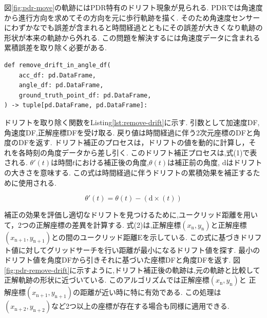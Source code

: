 


図\ref{fig:pdr-move}の軌跡にはPDR特有のドリフト現象が見られる.
PDRでは角速度から進行方向を求めてその方向を元に歩行軌跡を描く.
そのため角速度センサーにわずかなでも誤差が含まれると時間経過とともにその誤差が大きくなり軌跡の形状が本来の軌跡から外れる.
この問題を解決するには角速度データに含まれる累積誤差を取り除く必要がある.


\begin{lstlisting}[caption={ドリフト除去}, label=lst:remove-drift]
def remove_drift_in_angle_df(
    acc_df: pd.DataFrame,
    angle_df: pd.DataFrame,
    ground_truth_point_df: pd.DataFrame,
) -> tuple[pd.DataFrame, pd.DataFrame]:
\end{lstlisting}

ドリフトを取り除く関数をListing\ref{lst:remove-drift}に示す.
引数として加速度DF,角速度DF,正解座標DFを受け取る.
戻り値は時間経過に伴う2次元座標のDFと角度のDFを返す.
ドリフト補正のプロセスは，ドリフトの値を動的に計算し，それを各時刻の角度データから差し引く.
このドリフト補正プロセスは,式(1)で表される.
$\theta'(t)$は時間$t$における補正後の角度,$\theta(t)$は補正前の角度,
$\mathrm{d}$はドリフトの大きさを意味する.
この式は時間経過に伴うドリフトの累積効果を補正するために使用される.


\vspace{5mm} %

\begin{equation}
	\theta'(t) = \theta(t) - (\mathrm{d} \times (t))
\end{equation}

\vspace{5mm} %

補正の効果を評価し適切なドリフトを見つけるために,ユークリッド距離を用いて，2つの正解座標の差異を計算する.
式(2)は,正解座標$(x_{\mathrm{n}}, y_{\mathrm{n}})$と正解座標$(x_{\mathrm{n+1}}, 
y_{\mathrm{n+1}})$との間のユークリッド距離$\mathrm{E}$を示している.
この式に基づきドリフト値に対してグリッドサーチを行い距離が最小になるドリフト値を探す.
最小のドリフト値を角度DFから引きそれに基づいた座標DFと角度DFを返す.
図\ref{fig:pdr-remove-drift}に示すように,ドリフト補正後の軌跡は,元の軌跡と比較して正解軌跡の形状に近づいている.
このアルゴリズムでは正解座標$(x_{\mathrm{n}}, y_{\mathrm{n}})$と
正解座標$(x_{\mathrm{n+1}}, y_{\mathrm{n+1}})$の距離が近い時に特に有効である.
この処理は$(x_{\mathrm{n+2}}, y_{\mathrm{n+2}})$など2つ以上の座標が存在する場合も同様に適用できる.

